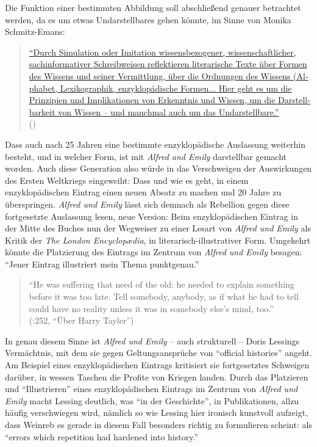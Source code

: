 \documentclass[fontsize=12pt]{scrartcl}
\begin{document}
Die Funktion einer bestimmten Abbildung soll abschlie{\ss}end genauer betrachtet werden, da es um etwas Undarstellbares gehen k\"onnte, im Sinne von Monika Schmitz-Emans:

\singlespacing
\begin{quote}
\href{http://www.actalitterarum.de/theorie/mse/enz/enzz01.html}{"`Durch Si­mu­la­ti­on oder Imi­ta­ti­on wis­sens­be­zo­ge­ner, wis­sen­schaft­li­cher, sach­in­for­ma­ti­ver Schreib­wei­sen re­flek­tie­ren li­te­ra­ri­sche Texte \"uber For­men des Wis­sens und sei­ner Ver­mitt­lung, \"uber die Ord­nun­gen des Wis­sens (Al­pha­bet, Le­xi­ko­gra­phik, en­zy­klo­p\"a­di­sche For­men... \mbox{Hier} geht es um die Prin­zi­pi­en und Im­pli­ka­tio­nen von Er­kennt­nis und Wis­sen, um die Dar­stell­bar­keit von Wis­sen -- und manch\-­mal auch um das Un­dar­stell­ba­re."'}\\ (\cite{Schmitz-Emans2010})
\end{quote}
\onehalfspacing

Dass auch nach 25 Jahren eine bestimmte enzyklop\"adische Auslassung weiterhin besteht, und in welcher Form, ist mit \textit{Alfred and Emily} darstellbar gemacht worden. Auch diese Generation also w\"urde in das Verschweigen der Auswirkungen des Ersten Weltkriegs eingeweiht: Dass und wie es geht, in einem enzyklop\"adischen Eintrag einen neuen Absatz zu machen und 20 Jahre zu \"uberspringen. \textit{Alfred und Emily} l\"asst sich demnach als Rebellion gegen diese fortgesetzte Auslassung lesen, neue Version: Beim enzyklop\"adischen Eintrag in der Mitte des Buches nun der Wegweiser zu einer Lesart von \textit{Alfred und Emily} als Kritik der \textit{The London Encyclop{\ae}dia}, in li\-te\-ra\-risch-illustrativer Form. Umgekehrt k\"onnte die Platzierung des Eintrags im Zentrum von \textit{Alfred und Emily} besagen: "`Jener Eintrag illustriert mein Thema punktgenau."' 

\singlespacing
\begin{quote}
"`He was suffering that need of the old: he needed to explain something before it was too late. Tell somebody, anybody, as if what he had to tell could have no reality unless it was in somebody else's mind, too."' \\(\cite{Lessing2008}:252, "`\"Uber Harry Tayler"')
\end{quote}
\onehalfspacing

In genau diesem Sinne ist \textit{Alfred und Emily} -- auch strukturell -- Doris Lessings Verm\"achtnis, mit dem sie gegen Geltungsanspr\"uche von "`official histories"' angeht. Am Beispiel eines enzyklop\"adischen Eintrags kritisiert sie fortgesetztes Schweigen dar\"uber, in wessen Taschen die Profite von Kriegen landen.
Durch das Platzieren und "`Illustrieren"' eines enzyklop\"adischen Eintrags im Zentrum von \textit{Alfred und Emily} macht Lessing deutlich, was "`in der Geschichte"', in Publikationen, allzu h\"aufig verschwiegen wird, n\"amlich so wie Lessing \mbox{hier} ironisch kunstvoll aufzeigt, dass Weinreb es gerade in diesem Fall besonders richtig zu formulieren scheint: als "`errors which repetition had hardened into history."'
\end{document}
